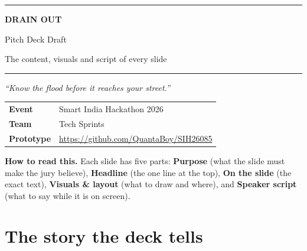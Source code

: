 \documentclass[11pt,a4paper]{article}
\begin{document}
\begin{titlepage}
  \centering
  \vspace*{3cm}
  {\color{accent}\rule{\linewidth}{1.2pt}}\par\vspace{0.6cm}
  {\Huge\bfseries DRAIN OUT\par}
  \vspace{0.3cm}
  {\LARGE Pitch Deck Draft\par}
  \vspace{0.4cm}
  {\large The content, visuals and script of every slide\par}
  \vspace{0.6cm}
  {\color{accent}\rule{\linewidth}{1.2pt}}\par
  \vspace{1.2cm}
  {\Large\itshape ``Know the flood before it reaches your street.''\par}
  \vspace{1.5cm}
  \begin{tabular}{@{}ll@{}}
    \textbf{Event}     & Smart India Hackathon 2026 \\
    \textbf{Team}      & Tech Sprints \\
    \textbf{Prototype} & \url{https://github.com/QuantaBoy/SIH26085} \\
  \end{tabular}
  \vfill
  \begin{minipage}{0.88\linewidth}\small
  \textbf{How to read this.} Each slide has five parts:
  {\color{ink!70}\textbf{Purpose}} (what the slide must make the jury believe),
  {\color{hook}\textbf{Headline}} (the one line at the top),
  {\color{accent}\textbf{On the slide}} (the exact text),
  {\color{visual}\textbf{Visuals \& layout}} (what to draw and where), and
  {\color{speak}\textbf{Speaker script}} (what to say while it is on screen).
  \end{minipage}
\end{titlepage}

\tableofcontents
\newpage

\section{The story the deck tells}
\end{document}
